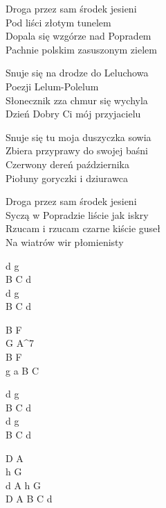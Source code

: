 \begin{text}
    Droga przez sam środek jesieni\\
    Pod liści złotym tunelem\\
    Dopala się wzgórze nad Popradem\\
    Pachnie polskim zasuszonym zielem

    \vin Snuje się na drodze do Leluchowa\\
    \vin Poezji Lelum-Polelum\\
    \vin Słonecznik zza chmur się wychyla\\
    \vin Dzień Dobry Ci mój przyjacielu

    Snuje się tu moja duszyczka sowia\\
    Zbiera przyprawy do swojej baśni\\
    Czerwony dereń października\\
    Piołuny goryczki i dziurawca

    Droga przez sam środek jesieni\\
    Syczą w Popradzie liście jak iskry\\
    Rzucam i rzucam czarne kiście guseł\\
    Na wiatrów wir płomienisty
\end{text}
\begin{chord}
    d g\\
    B C d\\
    d g\\
    B C d

    B F\\
    G A^7\\
    B F\\
    g a B C

    d g\\
    B C d\\
    d g\\
    B C d

    D A\\
    h G\\
    d A h G\\
    D A B C d
\end{chord}
